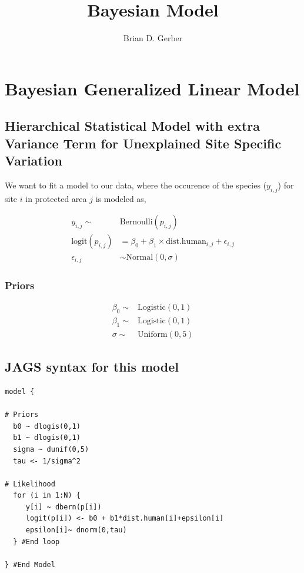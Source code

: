 \documentclass[12pt]{article}
\title{Bayesian  Model}
\author{Brian D. Gerber}
\begin{document}
\maketitle
\section{Bayesian Generalized Linear Model}
\subsection{Hierarchical Statistical Model with extra Variance Term for Unexplained Site Specific Variation}

\Large

We want to fit a model to our data, where the occurence of the species ($y_{i,j}$) for site $i$ in protected area $j$ is modeled as,

\begin{align*}
y_{i,j}\sim& \text{Bernoulli}(p_{i,j})\\
\text{logit}(p_{i,j}) &= \beta_{0} + \beta_{1}\times \text{dist.human}_{i,j}+ \epsilon_{i,j}\\
\epsilon_{i,j} &\sim \text{Normal}(0,\sigma)
\end{align*}

\subsubsection{Priors}

\begin{align*}
\beta_{0} \sim& \text{Logistic}(0, 1)\\
\beta_{1} \sim& \text{Logistic}(0, 1)\\
\sigma \sim& \text{Uniform}(0,5)
\end{align*}


\pagebreak

\subsection{JAGS syntax for this model}

\begin{verbatim}
model {

# Priors
  b0 ~ dlogis(0,1)
  b1 ~ dlogis(0,1)
  sigma ~ dunif(0,5)
  tau <- 1/sigma^2

# Likelihood
  for (i in 1:N) {
     y[i] ~ dbern(p[i])
     logit(p[i]) <- b0 + b1*dist.human[i]+epsilon[i]
     epsilon[i]~ dnorm(0,tau)
  } #End loop
  
} #End Model
\end{verbatim}
\end{document}
